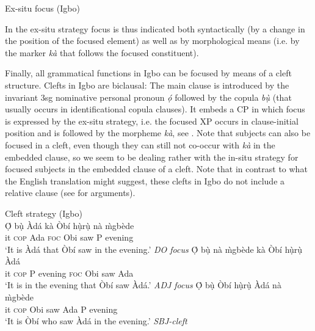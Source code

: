 \documentclass[output=paper,colorlinks,citecolor=brown]{langscibook}
\begin{document}
\enlargethispage{0.5\baselineskip}
\ea%
    \label{ex:amaechi:5}
    Ex-situ focus (Igbo)\\
    \z
\z

In the ex-situ strategy focus is thus indicated both syntactically (by a change in the position of the focused element) as well as by morphological means (i.e. by the marker \textit{k\`a} that follows the focused constituent).

Finally, all grammatical functions in Igbo can be focused by means of a cleft structure. Clefts in Igbo are biclausal: The main clause is introduced by the invariant 3sg nominative personal pronoun \textit{ọ́} followed by the copula  \textit{bụ̀} (that usually occurs in identificational copula clauses). It embeds a CP in which focus is expressed by the ex-situ strategy, i.e. the focused XP occurs in clause-initial position and is followed by the morpheme \textit{k\`a}, see . Note that subjects can also be focused in a cleft, even though they can still not co-occur with \textit{k\`a} in the embedded clause, so we seem to be dealing rather with the in-situ strategy for focused subjects in the embedded clause of a cleft. Note that in contrast to what the English translation might suggest, these clefts in Igbo do not include a relative clause (see \citealt{Amaechi2018} for arguments).

\ea%
    \label{ex:amaechi:6}
    Cleft strategy (Igbo)\\
    \ea\label{ex:amaechi:6a}
    \gll    Ọ́ bụ̀ Àdá kà Òbí hụ̀rụ̀ nà {\`m}gbède\\
            it \textsc{cop} Ada \textsc{foc} Obi saw P evening\\
    \glt    `It is Àdá that Òbí saw in the evening.' \hfill\textit{DO focus}
    \ex\label{ex:amaechi:6b}
    \gll    Ọ́ bụ̀ nà {\`m}gbède kà Òbí hụ̀rụ̀ Àdá\\
            it \textsc{cop} P evening \textsc{foc} Obi saw Ada\\
    \glt    `It is in the evening that Òbí saw Àdá.' \hfill\textit{ADJ  focus}
    \ex\label{ex:amaechi:6c}
    \gll    Ọ́ bụ̀ Òbí hụ̀rụ̀ Àdá nà {\`m}gbède\\
            it \textsc{cop} Obi saw Ada P evening\\
    \glt    `It is Òbí who saw Àdá in the evening.' \hfill\textit{SBJ-cleft}
    \z
\z
\end{document}
